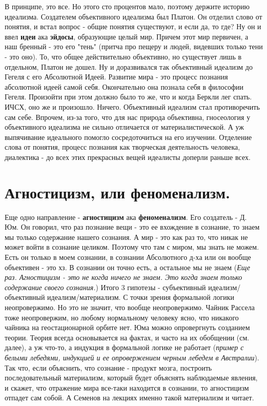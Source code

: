 В принципе, это все. Но этого сто процентов мало, поэтому держите историю идеализма. Создателем объективного идеализма был Платон. Он отделил слово от понятия, и встал вопрос - общие понятия существуют, и если да, то где? Ну он и ввел \textbf{идеи} ака \textbf{эйдосы}, образующие целый мир. Причем этот мир первичен, а наш бренный - это его "тень" (притча про пещеру и людей, видевших только тени - это оно). То, что общее действительно объективно, но существует лишь в отдельном, Платон не дошел. Ну и доразвивался так объективный идеализм до Гегеля с его Абсолютной Идеей. Развитие мира - это процесс познания абсолютной идеей самой себя. Окончательно она познала себя в философии Гегеля. Произойти при этом должно было то же, что и когда Беркли лег спать. ИЧСХ, оно же и произошло. Ничего. Объективный идеализм стал противоречить сам себе. Впрочем, из-за того, что для нас природа объективна, гносеология у объективного идеализма не сильно отличается от материалистической. А уж выпячивание идеального помогло сосредоточиться на его изучении. Отделение слова от понятия, процесс познания как творческая деятельность человека, диалектика - до всех этих прекрасных вещей идеалисты доперли раньше всех.

\section{ Агностицизм, или феноменализм.}
Еще одно направление - \textbf{агностицизм} ака \textbf{феноменализм}. Его создатель - Д. Юм. Он говорил, что раз познание вещи - это ее вхождение в сознание, то знаем мы только содержание нашего сознания. А мир - это как раз то, что никак не может войти в сознание целиком. Поэтому что там с миром, мы знать не можем. Есть он только в моем сознании, в сознании Абсолютного д-ха или он вообще объективен - это хз. В сознании он точно есть, а остальное мы не знаем (\textit{Еще раз. Агностицизм - это не когда ничего не знаем. Это когда знаем только содержание своего сознания.}) Итого 3 гипотезы - субъективный идеализм/объективный идеализм/материализм. С точки зрения формальной логики неопровержимо. Но это не значит, что вообще неопровержимо. Чайник Рассела тоже неопровержим, но любому нормальному человеку ясно, что никакого чайника на геостационарной орбите нет. Юма можно опровергнуть созданием теории. Теория всегда основывается на фактах, и часто на их обобщении (см. далее), а уж что-то, а индукция в формальной логике не работает (\textit{пример с белыми лебедями, индукцией и ее опровержением черным лебедем в Австралии}). Так что, если объяснить, что сознание - продукт мозга, построить последовательный материализм, который будет объяснять наблюдаемые явления, и скажет, что отражение мира все-таки находится в сознании, то агностицизм отпадет сам собой. А Семенов на лекциях именно такой материализм и читает. 

